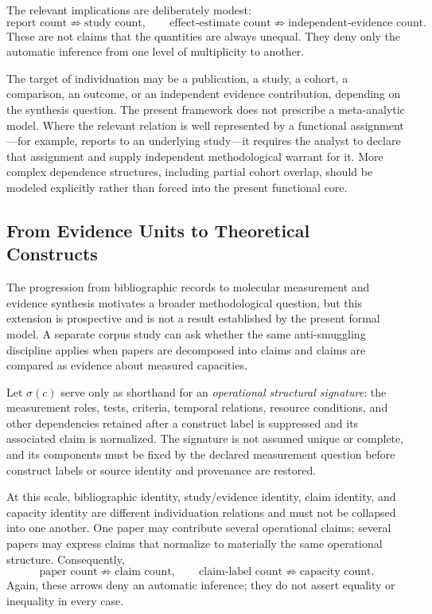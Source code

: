 \documentclass[12pt]{article}
\begin{document}
The relevant implications are deliberately modest:
\[
\text{report count}
\not\Rightarrow
\text{study count},
\qquad
\text{effect-estimate count}
\not\Rightarrow
\text{independent-evidence count}.
\]
These are not claims that the quantities are always unequal. They deny only the automatic inference from one level of multiplicity to another.

The target of individuation may be a publication, a study, a cohort, a comparison, an outcome, or an independent evidence contribution, depending on the synthesis question. The present framework does not prescribe a meta-analytic model. Where the relevant relation is well represented by a functional assignment---for example, reports to an underlying study---it requires the analyst to declare that assignment and supply independent methodological warrant for it. More complex dependence structures, including partial cohort overlap, should be modeled explicitly rather than forced into the present functional core.

\subsection{From Evidence Units to Theoretical Constructs}

The progression from bibliographic records to molecular measurement and evidence synthesis motivates a broader methodological question, but this extension is prospective and is not a result established by the present formal model. A separate corpus study can ask whether the same anti-smuggling discipline applies when papers are decomposed into claims and claims are compared as evidence about measured capacities.

Let \(\sigma(c)\) serve only as shorthand for an \emph{operational structural signature}: the measurement roles, tests, criteria, temporal relations, resource conditions, and other dependencies retained after a construct label is suppressed and its associated claim is normalized. The signature is not assumed unique or complete, and its components must be fixed by the declared measurement question before construct labels or source identity and provenance are restored.

At this scale, bibliographic identity, study/evidence identity, claim identity, and capacity identity are different individuation relations and must not be collapsed into one another. One paper may contribute several operational claims; several papers may express claims that normalize to materially the same operational structure. Consequently,
\[
\text{paper count}
\not\Rightarrow
\text{claim count},
\qquad
\text{claim-label count}
\not\Rightarrow
\text{capacity count}.
\]
Again, these arrows deny an automatic inference; they do not assert equality or inequality in every case.
\end{document}
